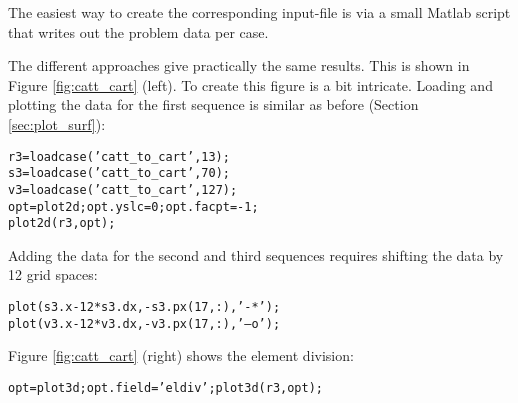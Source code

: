 \documentclass[12pt]{report}
\begin{document}
The easiest way to create the corresponding input-file is via a small
Matlab script that writes out the problem data per case.

The different approaches give practically the same results. This is shown 
in Figure \ref{fig:catt_cart} (left). To create this figure is a bit
intricate. Loading and plotting the data for the first sequence is similar
as before (Section \ref{sec:plot_surf}):
\begin{alltt}\small
r3=loadcase('catt_to_cart',13);  % "r3" = rolling, 3 units == case 13
s3 = loadcase('catt_to_cart',70);  % "s3" = shift + fixed view, case 70
v3 = loadcase('catt_to_cart',127); % "v3" = shift + moving view, case 127
opt=plot2d; opt.yslc=0; opt.facpt=-1;
plot2d(r3,opt);
\end{alltt}
Adding the data for the second and third sequences requires shifting the
data by 12 grid spaces:
\begin{alltt}\small
plot(s3.x-12*s3.dx, -s3.px(17,:), '-*');  % row 17 == centerline y=0.
plot(v3.x-12*v3.dx, -v3.px(17,:), '--o');
\end{alltt}
Figure \ref{fig:catt_cart} (right) shows the element division:
\begin{alltt}\small
opt=plot3d; opt.field='eldiv'; plot3d(r3,opt);
\end{alltt}
\end{document}
